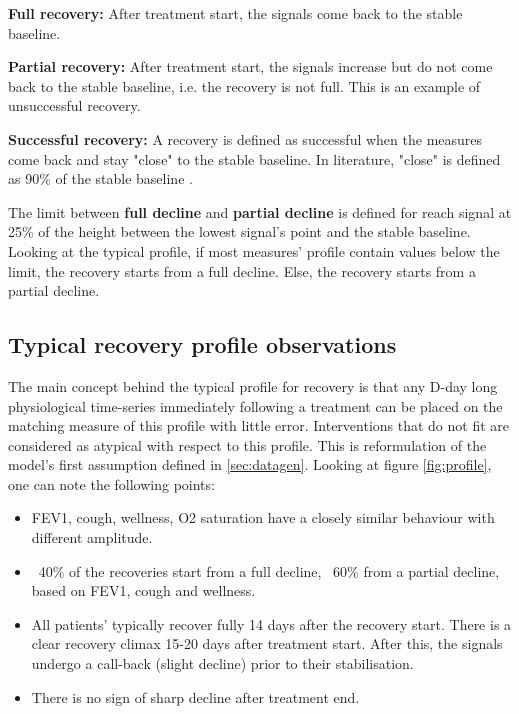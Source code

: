
\textbf{Full recovery:} After treatment start, the signals come back to the stable baseline.

\textbf{Partial recovery:} After treatment start, the signals increase but do not come back to the stable baseline, i.e. the recovery is not full. This is an example of unsuccessful recovery.

\textbf{Successful recovery:} A recovery is defined as successful when the measures come back and stay "close" to the stable baseline. In literature, "close" is defined as 90\% of the stable baseline \cite{morgan_2017}.

The limit between \textbf{full decline} and \textbf{partial decline} is defined for reach signal at 25\% of the height between the lowest signal's point and the stable baseline. Looking at the typical profile, if most measures' profile contain values below the limit, the recovery starts from a full decline. Else, the recovery starts from a partial decline.

\subsection{Typical recovery profile observations}
The main concept behind the typical profile for recovery is that any D-day long physiological time-series immediately following a treatment can be placed on the matching measure of this profile with little error. Interventions that do not fit are considered as atypical with respect to this profile. This is reformulation of the model's first assumption defined in \ref{sec:datagen}. Looking at figure \ref{fig:profile}, one can note the following points:
\begin{itemize}
    \item FEV1, cough, wellness, O2 saturation have a closely similar behaviour with different amplitude.
    \item ~40\% of the recoveries start from a full decline, ~60\% from a partial decline, based on FEV1, cough and wellness.
    \item All patients' typically recover fully 14 days after the recovery start. There is a clear recovery climax 15-20 days after treatment start. After this, the signals undergo a call-back (slight decline) prior to their stabilisation.
    \item There is no sign of sharp decline after treatment end.
\end{itemize}

